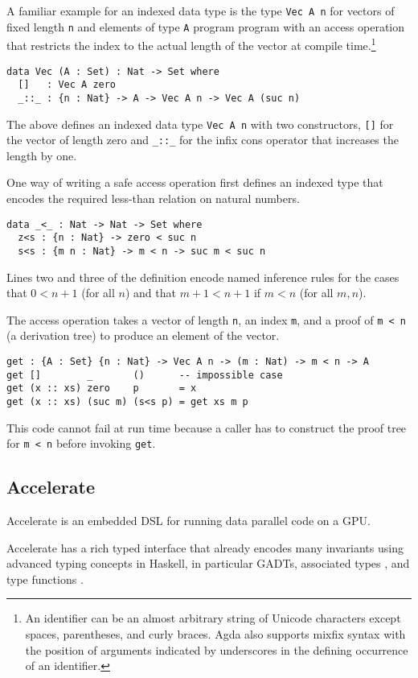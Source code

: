 \documentclass{llncs}
\begin{document}
A familiar example for an indexed data type is the type
\verb+Vec A n+ for vectors of fixed length \verb+n+ and elements of
type \verb+A+ program program with an access operation that restricts the index to the
actual length of the vector at compile time.\footnote{An
  identifier can be an almost arbitrary 
  string of Unicode characters except spaces, parentheses, and curly
  braces. Agda also supports mixfix syntax with the position of
  arguments indicated by underscores in the defining occurrence of an
  identifier.} 
\begin{verbatim}
data Vec (A : Set) : Nat -> Set where
  []   : Vec A zero
  _::_ : {n : Nat} -> A -> Vec A n -> Vec A (suc n)
\end{verbatim}
The above defines an indexed data type \verb+Vec A n+ with two
constructors, \verb+[]+ for the vector of length zero and 
\verb+_::_+ for the infix cons operator that increases the length by one.

One way of writing a safe access operation first defines an indexed
type that encodes the required less-than relation on natural numbers.
\begin{verbatim}
data _<_ : Nat -> Nat -> Set where
  z<s : {n : Nat} -> zero < suc n
  s<s : {m n : Nat} -> m < n -> suc m < suc n
\end{verbatim}
Lines two and three of the definition encode named inference rules for
the cases that $0 < n+1$ (for all $n$) and that $m+1 < n+1$ if $m < n$
(for all $m,n$).

The access operation takes a vector of length \verb+n+, an index
\verb+m+, and a proof of \verb+m < n+ (a derivation tree) to produce
an element of the vector.  
\begin{verbatim}
get : {A : Set} {n : Nat} -> Vec A n -> (m : Nat) -> m < n -> A
get []        _       ()      -- impossible case
get (x :: xs) zero    p       = x
get (x :: xs) (suc m) (s<s p) = get xs m p
\end{verbatim}
This code cannot fail at run time because a caller has to
construct the proof tree for \verb+m < n+ before invoking \verb+get+.

\subsection{Accelerate}
\label{sec:accelerate}

Accelerate \cite{ChakravartyKellerLeeMcdonellGrover2011} is an
embedded DSL for running data parallel code on a GPU. 

Accelerate has a rich typed interface that already encodes many
invariants using advanced typing concepts in Haskell, in particular
GADTs\cite{PeytonJonesVytiniotisWeirichWashburn2006}, associated types
\cite{ChakravartyKellerJones2005}, and type functions
\cite{SchrijversPeytonJonesChakravartySulzmann2008}. 
\end{document}
